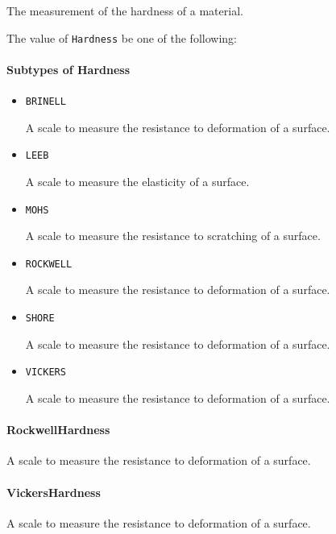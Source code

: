 The measurement of the hardness of a material.


The value of \texttt{Hardness} \MUST be one of the following: 

\FloatBarrier

\paragraph{Subtypes of Hardness}\mbox{}
\label{sec:Subtypes of Hardness}

\begin{itemize}

\item \texttt{BRINELL}


A scale to measure the resistance to deformation of a surface.

\item \texttt{LEEB}


A scale to measure the elasticity of a surface.

\item \texttt{MOHS}


A scale to measure the resistance to scratching of a surface.

\item \texttt{ROCKWELL}


A scale to measure the resistance to deformation of a surface.

\item \texttt{SHORE}


A scale to measure the resistance to deformation of a surface.

\item \texttt{VICKERS}


A scale to measure the resistance to deformation of a surface.


\end{itemize}

\paragraph{RockwellHardness}\mbox{}
\label{sec:RockwellHardness}


A scale to measure the resistance to deformation of a surface.


\paragraph{VickersHardness}\mbox{}
\label{sec:VickersHardness}


A scale to measure the resistance to deformation of a surface.


